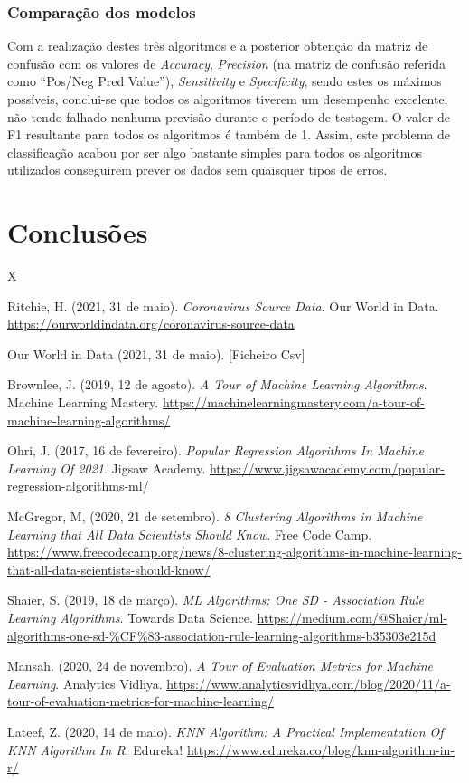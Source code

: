 \documentclass[conference]{IEEEtran}
\begin{document}
\subsubsection{Comparação dos modelos}
Com a realização destes três algoritmos e a posterior obtenção da matriz de confusão com os valores de \textit{Accuracy}, \textit{Precision} (na matriz de confusão referida como “Pos/Neg Pred Value”), \textit{Sensitivity} e \textit{Specificity}, sendo estes os máximos possíveis, conclui-se que todos os algoritmos tiverem um desempenho excelente, não tendo falhado nenhuma previsão durante o período de testagem. O valor de F1 resultante para todos os algoritmos é também de 1.
Assim, este problema de classificação acabou por ser algo bastante simples para todos os algoritmos utilizados conseguirem prever os dados sem quaisquer tipos de erros.




\section{Conclusões} %
X

\begin{thebibliography}{00}

 Ritchie, H. (2021, 31 de maio). \textit{Coronavirus Source Data}. Our World in Data. \url{https://ourworldindata.org/coronavirus-source-data}

 Our World in Data (2021, 31 de maio). [Ficheiro Csv]

 Brownlee, J. (2019, 12 de agosto). \textit{A Tour of Machine Learning Algorithms}. Machine Learning Mastery. \url{https://machinelearningmastery.com/a-tour-of-machine-learning-algorithms/}

 Ohri, J. (2017, 16 de fevereiro). \textit{Popular Regression Algorithms In Machine Learning Of 2021}. Jigsaw Academy. \url{https://www.jigsawacademy.com/popular-regression-algorithms-ml/}

 McGregor, M, (2020, 21 de setembro). \textit{8 Clustering Algorithms in Machine Learning that All Data Scientists Should Know}. Free Code Camp. \url{https://www.freecodecamp.org/news/8-clustering-algorithms-in-machine-learning-that-all-data-scientists-should-know/ }

 Shaier, S. (2019, 18 de março). \textit{ML Algorithms: One SD - Association Rule Learning Algorithms}. Towards Data Science. \url{https://medium.com/@Shaier/ml-algorithms-one-sd-%CF%83-association-rule-learning-algorithms-b35303e215d}

 Mansah. (2020, 24 de novembro). \textit{A Tour of Evaluation Metrics for Machine Learning}. Analytics Vidhya. \url{https://www.analyticsvidhya.com/blog/2020/11/a-tour-of-evaluation-metrics-for-machine-learning/}

 Lateef, Z. (2020, 14 de maio). \textit{KNN Algorithm: A Practical Implementation Of KNN Algorithm In R}. Edureka! \url{https://www.edureka.co/blog/knn-algorithm-in-r/}

\end{thebibliography}
\end{document}
